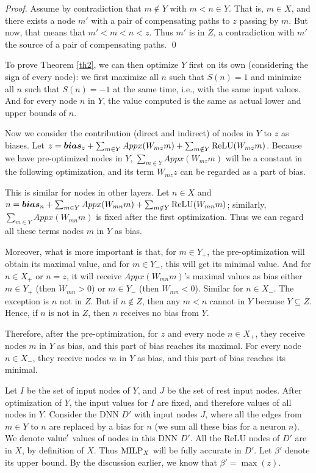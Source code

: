 \begin{proof}
Assume by contradiction that $m \notin Y$ with $m<n \in Y$.
That is, $m \in X$, and there exists a node $m'$ with a pair of compensating paths to $z$
passing by $m$. But now, that means that $m'<m<n<z$.
Thus $m'$ is in $Z$, a contradiction with $m'$ the source of a pair of compensating paths.
\qed
\end{proof}

To prove Theorem \ref{th2}, we can then optimize $Y$ first on its own (considering the sign of every node): we first maximize all $n$ such that $S(n)=1$ and minimize all $n$ such that 
$S(n)=-1$ at the same time, i.e., with the same input values. And for every node $n$ in $Y$, the value computed is the same as actual lower and upper bounds of $n$.


Now we consider the contribution  (direct and indirect) of nodes in $Y$ to $z$ as biases. Let $z=\boldsymbol{bias}_z+\sum_{m\in Y} Appx(W_{mz}m)+\sum_{m\notin Y} \mathrm{ReLU}(W_{mz}m)$. Because we have pre-optimized nodes in $Y$, $\sum_{m\in Y} Appx(W_{mz}m)$ will be a constant in the following optimization, and its term $W_{mz}z$ can be regarded as a part of bias. 

This is similar for nodes in other layers. Let $n\in X$ and $n=\boldsymbol{bias}_n+\sum_{m\in Y} Appx(W_{mn}m)+\sum_{m\notin Y} \mathrm{ReLU}(W_{mn}m)$; similarly, $\sum_{m\in Y}Appx(W_{mn}m)$ is fixed after the first optimization. Thus we can regard all these terms nodes $m$ in $Y$ as bias.



Moreover, what is more important is that,  for $m\in Y_+$, the pre-optimization will obtain its maximal value, and for $m\in Y_-$, this will get its minimal value. And for $n\in X_+$ or $n=z$, it will receive $Appx(W_{mn}m)$'s maximal values as bias either $m\in Y_+$ (then $W_{mn}>0$) or $m\in Y_-$ (then $W_{mn}<0$). Similar for $n\in X_-$. The exception is $n$ not in $Z$. But if $n\notin Z$, then any $m<n$ cannot in $Y$ because $Y\subseteq Z$.   Hence, if $n$ is not in $Z$, then $n$ receives no bias from $Y$.


Therefore, after the pre-optimization, for $z$ and every node $n\in X_+$, they receive nodes $m$ in $Y$ as bias, and this part of bias reaches its maximal. For every node $n\in X_-$,  they receive nodes $m$ in $Y$ as bias, and this part of bias reaches its minimal.


Let $I$ be the set of input nodes of $Y$, and $J$ be the set of rest input nodes.
After optimization of $Y$, the input values for $I$ are fixed, and therefore values of all nodes in $Y$.
Consider the DNN $D'$ with input nodes $J$, where all the 
edges from $m \in Y$ to $n$ are replaced by a bias for $n$ (we sum all these bias for a neuron $n$).
We denote ${\textrm{value}}'$ values of nodes in this DNN $D'$. All the ReLU nodes of $D'$ are in $X$, by definition of $X$.
Thus ${\textrm{MILP}}_X$ will be fully accurate in $D'$. Let $\beta'$ denote its upper bound. By the discussion earlier, we know that $\beta'=\max(z)$.


